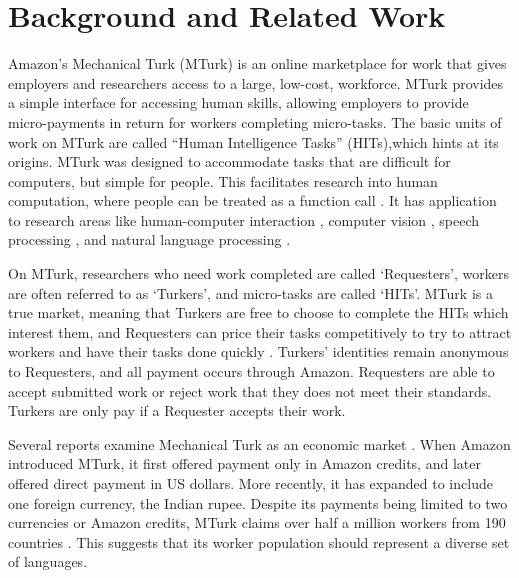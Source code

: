 \documentclass[11pt]{article}
\begin{document}

\section{Background and Related Work}
Amazon's Mechanical Turk (MTurk) is an online marketplace for work that gives employers and researchers access to a large, low-cost, workforce. MTurk provides a simple interface for accessing human skills, allowing employers to provide micro-payments in return for workers completing micro-tasks.  The basic units of work on MTurk are called ``Human Intelligence Tasks'' (HITs),which hints at its origins.  MTurk was designed to accommodate tasks that are difficult for computers, but simple for people. This facilitates research into human computation, where people can be treated as a function call \cite{vonAhnThesis,Little2009,quinn-bederson:2011}.  It has application to research areas like human-computer interaction \cite{bigham-et-al:2010,bernstein-et-al:2010}, computer vision  \cite{sorkin-forsyth:2008,deng-et-al:2010,rashtchian:10}, speech processing \cite{marge:10,lane-EtAl:2010:MTURK,Parent-Eskenazi:2011,Eskenazi:2013:crowdsourcing-speech-book},  and natural language processing \cite{Snow2008,callisonburch-dredze:2010:MTURK,laws-scheible-schutze:2011:EMNLP}. 

\nocite{novotney-callisonburch:2010:NAACLHLT}

On MTurk, researchers who need work completed are called `Requesters', workers are often referred to as `Turkers', and micro-tasks are called `HITs'.  MTurk is a true market, meaning that Turkers are free to choose to complete the HITs which interest them, and Requesters can price their tasks competitively to try to attract workers and have their tasks done quickly \cite{faridani-et-al:2011,singer-mittal:2011}. Turkers' identities remain anonymous to Requesters, and all payment occurs through Amazon. Requesters are able to accept submitted work or reject work that they does not meet their standards.  Turkers are only pay if a Requester accepts their work. 

Several reports examine Mechanical Turk as an economic market \cite{ipeirotis:2010:marketplace,lehdonvirta-ernkvist:2011}.  When Amazon introduced MTurk, it first offered payment only in Amazon credits, and later offered direct payment in US dollars. More recently, it has expanded to include one foreign currency, the Indian rupee. Despite its payments being limited to two currencies or Amazon credits, MTurk claims over half a million workers from 190 countries \cite{AmazonRequesterTour}.  This suggests that its worker population should represent a diverse set of languages.
\end{document}
